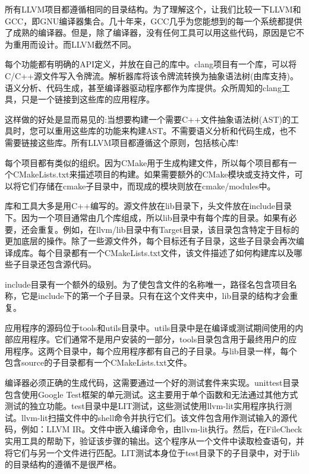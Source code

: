 所有LLVM项目都遵循相同的目录结构。为了理解这个，让我们比较一下LLVM和GCC，即GNU编译器集合。几十年来，GCC几乎为您能想到的每一个系统都提供了成熟的编译器。但是，除了编译器，没有任何工具可以用这些代码，原因是它不为重用而设计。而LLVM截然不同。\par

每个功能都有明确的API定义，并放在自己的库中。clang项目有一个库，可以将C/C++源文件写入令牌流。解析器库将该令牌流转换为抽象语法树(由库支持)。语义分析、代码生成，甚至编译器驱动程序都作为库提供。众所周知的clang工具，只是一个链接到这些库的应用程序。\par

这样做的好处是显而易见的:当想要构建一个需要C++文件抽象语法树(AST)的工具时，您可以重用这些库的功能来构建AST。不需要语义分析和代码生成，也不需要链接这些库。所有LLVM项目都遵循这个原则，包括核心库!\par

每个项目都有类似的组织。因为CMake用于生成构建文件，所以每个项目都有一个CMakeLists.txt来描述项目的构建。如果需要额外的CMake模块或支持文件，可以将它们存储在cmake子目录中，而现成的模块则放在cmake/modules中。\par

库和工具大多是用C++编写的。源文件放在lib目录下，头文件放在include目录下。因为一个项目通常由几个库组成，所以lib目录中有每个库的目录。如果有必要，还会重复。例如，在llvm/lib目录中有Target目录，该目录包含特定于目标的更加底层的操作。除了一些源文件外，每个目标还有子目录，这些子目录会再次编译成库。每个目录都有一个CMakeLists.txt文件，该文件描述了如何构建库以及哪些子目录还包含源代码。\par

include目录有一个额外的级别。为了使包含文件的名称唯一，路径名包含项目名称，它是include下的第一个子目录。只有在这个文件夹中，lib目录的结构才会重复。\par

应用程序的源码位于tools和utils目录中。utils目录中是在编译或测试期间使用的内部应用程序。它们通常不是用户安装的一部分，tools目录包含用于最终用户的应用程序。这两个目录中，每个应用程序都有自己的子目录。与lib目录一样，每个包含source的子目录都有一个CMakeLists.txt文件。\par

编译器必须正确的生成代码，这需要通过一个好的测试套件来实现。unittest目录包含使用Google Test框架的单元测试。这主要用于单个函数和无法通过其他方式测试的独立功能。test目录中是LIT测试，这些测试使用llvm-lit实用程序执行测试。llvm-lit扫描文件中的shell命令并执行它们。该文件包含用作测试输入的源代码，例如：LLVM IR。文件中嵌入编译命令，由llvm-lit执行。然后，在FileCheck实用工具的帮助下，验证该步骤的输出。这个程序从一个文件中读取检查语句，并将它们与另一个文件进行匹配。LIT测试本身位于test目录下的子目录中，对于lib的目录结构的遵循不是很严格。\par

